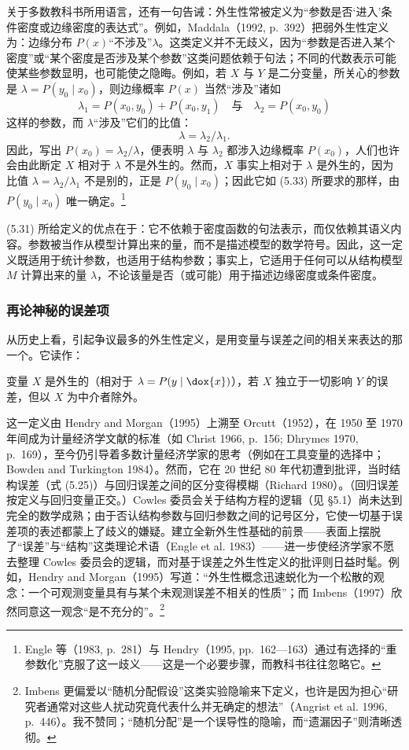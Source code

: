 关于多数教科书所用语言，还有一句告诫：外生性常被定义为“参数是否‘进入’条件密度或边缘密度的表达式”。例如，Maddala（1992, p.~392）把弱外生性定义为：边缘分布 $P(x)$“不涉及”$\lambda$。这类定义并不无歧义，因为“参数是否进入某个密度”或“某个密度是否涉及某个参数”这类问题依赖于句法；不同的代数表示可能使某些参数显明，也可能使之隐晦。例如，若 $X$ 与 $Y$ 是二分变量，所关心的参数是 $\lambda=P(y_0\mid x_0)$，则边缘概率 $P(x)$ 当然“涉及”诸如
\[
\lambda_1=P(x_0,y_0)+P(x_0,y_1)
\quad\text{与}\quad
\lambda_2=P(x_0,y_0)
\]
这样的参数，而 $\lambda$“涉及”它们的比值：
\[
\lambda=\lambda_2/\lambda_1.
\]
因此，写出 $P(x_0)=\lambda_2/\lambda$，便表明 $\lambda$ 与 $\lambda_2$ 都涉入边缘概率 $P(x_0)$，人们也许会由此断定 $X$ 相对于 $\lambda$ 不是外生的。然而，$X$ 事实上相对于 $\lambda$ 是外生的，因为比值 $\lambda=\lambda_2/\lambda_1$ 不是别的，正是 $P(y_0\mid x_0)$；因此它如 \textup{(5.33)} 所要求的那样，由 $P(y_0\mid x_0)$ 唯一确定。\footnote{Engle 等（1983, p.~281）与 Hendry（1995, pp.~162—163）通过有选择的“重参数化”克服了这一歧义——这是一个必要步骤，而教科书往往忽略它。}

\textup{(5.31)} 所给定义的优点在于：它不依赖于密度函数的句法表示，而仅依赖其语义内容。参数被当作从模型计算出来的量，而不是描述模型的数学符号。因此，这一定义既适用于统计参数，也适用于结构参数；事实上，它适用于任何可以从结构模型 $M$ 计算出来的量 $\lambda$，不论该量是否（或可能）用于描述边缘密度或条件密度。

\subsubsection*{再论神秘的误差项}

从历史上看，引起争议最多的外生性定义，是用变量与误差之间的相关来表达的那一个。它读作：

\begin{definition}[基于误差的外生性]
变量 $X$ 是外生的（相对于 $\lambda=P(y\mid \dox{x})$），若 $X$ 独立于一切影响 $Y$ 的误差，但以 $X$ 为中介者除外。
\end{definition}

这一定义由 Hendry and Morgan（1995）上溯至 Orcutt（1952），在 1950 至 1970 年间成为计量经济学文献的标准（如 Christ 1966, p.~156; Dhrymes 1970, p.~169），至今仍引导着多数计量经济学家的思考（例如在工具变量的选择中；Bowden and Turkington 1984）。然而，它在 20 世纪 80 年代初遭到批评，当时结构误差（式 \textup{(5.25)}）与回归误差之间的区分变得模糊（Richard 1980）。（回归误差按定义与回归变量正交。）Cowles 委员会关于结构方程的逻辑（见 \S 5.1）尚未达到完全的数学成熟；由于否认结构参数与回归参数之间的记号区分，它使一切基于误差项的表述都蒙上了歧义的嫌疑。建立全新外生性基础的前景——表面上摆脱了“误差”与“结构”这类理论术语（Engle et al. 1983）——进一步使经济学家不愿去整理 Cowles 委员会的逻辑，而对基于误差之外生性定义的批评则日益时髦。例如，Hendry and Morgan（1995）写道：“外生性概念迅速蜕化为一个松散的观念：一个可观测变量具有与某个未观测误差不相关的性质”；而 Imbens（1997）欣然同意这一观念“是不充分的”。\footnote{Imbens 更偏爱以“随机分配假设”这类实验隐喻来下定义，也许是因为担心“研究者通常对这些人扰动究竟代表什么并无确定的想法”（Angrist et al. 1996, p.~446）。我不赞同；“随机分配”是一个误导性的隐喻，而“遗漏因子”则清晰透彻。}

